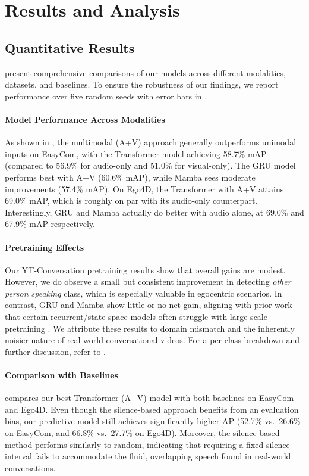 \section{Results and Analysis}\label{sec:results}
\subsection{Quantitative Results}\label{subsec:quant}
 present comprehensive comparisons of our models across different modalities, datasets, and baselines. To ensure the robustness of our findings, we report performance over five random seeds with error bars in .
\paragraph{Model Performance Across Modalities}
As shown in , the multimodal (A+V) approach generally outperforms unimodal inputs on EasyCom, with the Transformer model achieving 58.7\% mAP (compared to 56.9\% for audio-only and 51.0\% for visual-only). The GRU model performs 
best with A+V (60.6\% mAP), while Mamba sees moderate improvements (57.4\% mAP). On Ego4D, the Transformer with A+V attains 69.0\% mAP, which is roughly on par with its audio-only counterpart. Interestingly, GRU and Mamba actually do better with audio alone, at 69.0\% and 67.9\% mAP respectively.




\paragraph{Pretraining Effects}
Our YT-Conversation pretraining results show that overall gains are modest. However, 
we do observe a small but consistent improvement in detecting \emph{other person speaking} class, which is especially valuable in egocentric scenarios. In contrast, GRU and Mamba show 
little or no net gain, aligning with prior work that certain recurrent/state-space models 
often struggle with large-scale pretraining \cite{wang2023pretraining}. 
We attribute these results to domain mismatch and the inherently noisier nature of real-world conversational videos. For a per-class breakdown and further discussion, refer to .


\paragraph{Comparison with Baselines}
 compares our best Transformer (A+V) model with both baselines 
on EasyCom and Ego4D. Even though the silence-based approach benefits from an evaluation bias, 
our predictive model still achieves significantly higher AP (52.7\% vs.\ 26.6\% on EasyCom, and 66.8\% vs.\ 27.7\% on Ego4D). Moreover, the silence-based method performs similarly to random, indicating that requiring a fixed silence interval fails to accommodate the fluid, overlapping speech found in real-world conversations.

